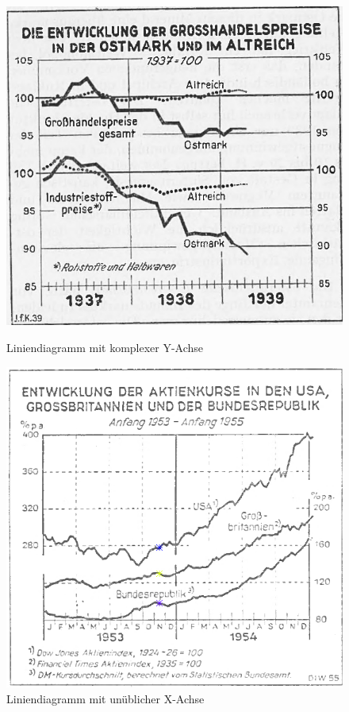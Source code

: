 \begin{figure}[H] %
    \centering
    \begin{minipage}{0.475\textwidth} %
        \centering
        \includegraphics[width=\linewidth]{Experimente/img/f1.png}
        \caption{ Liniendiagramm mit komplexer Y-Achse}
        \label{fig:f1}
    \end{minipage}\hfill %
    \begin{minipage}{0.475\textwidth} %
        \centering
        \includegraphics[width=\linewidth]{Experimente/img/f2.png}
        \caption{ Liniendiagramm mit unüblicher X-Achse}
        \label{fig:f2}
    \end{minipage}
\end{figure}


